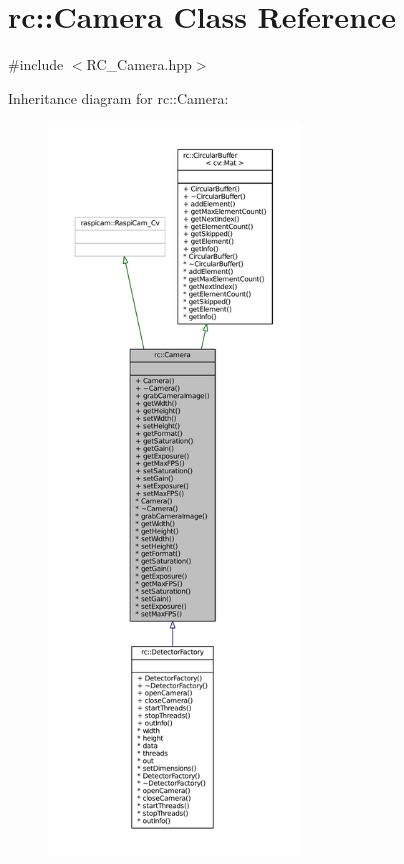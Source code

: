 \hypertarget{classrc_1_1Camera}{\section{rc\+:\+:Camera Class Reference}
\label{classrc_1_1Camera}
}


{\ttfamily \#include $<$R\+C\+\_\+\+Camera.\+hpp$>$}



Inheritance diagram for rc\+:\+:Camera\+:\nopagebreak
\begin{figure}[H]
\begin{center}
\leavevmode
\includegraphics[height=550pt]{classrc_1_1Camera__inherit__graph}
\end{center}
\end{figure}


